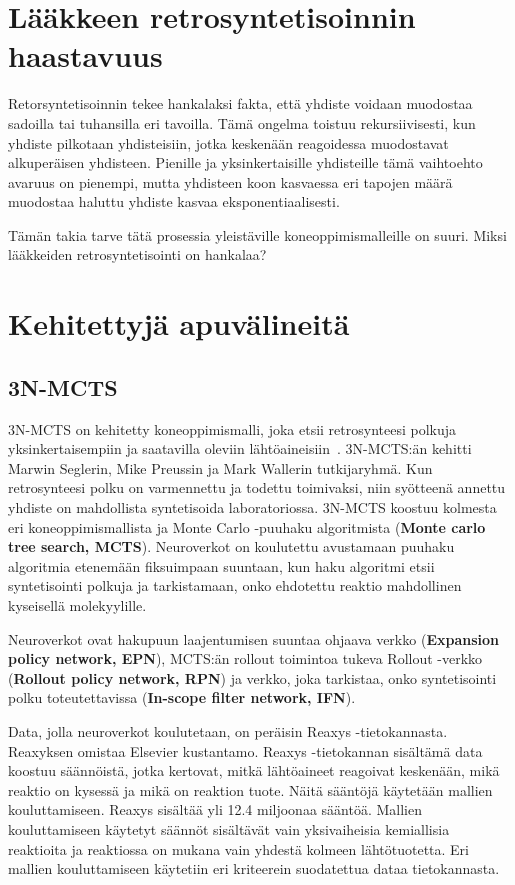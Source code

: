 \documentclass[finnish,twoside,censored,subject,sw-line]{HYthesisML}
\begin{document}
\section{Lääkkeen retrosyntetisoinnin haastavuus}

Retorsyntetisoinnin tekee hankalaksi fakta, että yhdiste voidaan muodostaa sadoilla tai tuhansilla eri tavoilla.
Tämä ongelma toistuu rekursiivisesti, kun yhdiste pilkotaan yhdisteisiin, jotka keskenään reagoidessa muodostavat alkuperäisen yhdisteen.
Pienille ja yksinkertaisille yhdisteille tämä vaihtoehto avaruus on pienempi, mutta yhdisteen koon kasvaessa eri tapojen määrä muodostaa haluttu yhdiste kasvaa eksponentiaalisesti.

Tämän takia tarve tätä prosessia yleistäville koneoppimismalleille on suuri.
Miksi lääkkeiden retrosyntetisointi on hankalaa?~\cite{ButlerKeithT2018Mlfm,deAlmeidaA.Filipa2019Socd}

\section{Kehitettyjä apuvälineitä}

\subsection{3N-MCTS}

3N-MCTS on kehitetty koneoppimismalli, joka etsii retrosynteesi polkuja yksinkertaisempiin
ja saatavilla oleviin lähtöaineisiin~\cite{SeglerMarwinHS2018Pcsw}. 3N-MCTS:än kehitti Marwin Seglerin, Mike Preussin ja Mark Wallerin tutkijaryhmä. Kun retrosynteesi polku on varmennettu ja
todettu toimivaksi, niin syötteenä annettu yhdiste on mahdollista syntetisoida laboratoriossa.
3N-MCTS koostuu kolmesta eri koneoppimismallista ja Monte Carlo -puuhaku algoritmista
(\textbf{Monte carlo tree search, MCTS}). Neuroverkot on koulutettu avustamaan puuhaku algoritmia etenemään
fiksuimpaan suuntaan, kun haku algoritmi etsii syntetisointi polkuja ja tarkistamaan, onko ehdotettu reaktio
mahdollinen kyseisellä molekyylille.

Neuroverkot ovat hakupuun laajentumisen suuntaa ohjaava verkko (\textbf{Expansion policy network, EPN}),
MCTS:än rollout toimintoa tukeva Rollout -verkko (\textbf{Rollout policy network, RPN})
ja verkko, joka tarkistaa, onko syntetisointi polku toteutettavissa (\textbf{In-scope filter network, IFN}).

Data, jolla neuroverkot koulutetaan, on peräisin Reaxys -tietokannasta. Reaxyksen omistaa Elsevier kustantamo. Reaxys -tietokannan sisältämä data koostuu
säännöistä, jotka kertovat, mitkä lähtöaineet reagoivat keskenään, mikä reaktio on kysessä ja mikä on reaktion
tuote. Näitä sääntöjä käytetään mallien kouluttamiseen. Reaxys sisältää yli 12.4 miljoonaa sääntöä. Mallien
kouluttamiseen käytetyt säännöt sisältävät vain yksivaiheisia kemiallisia reaktioita ja reaktiossa on mukana vain
yhdestä kolmeen lähtötuotetta. Eri mallien kouluttamiseen käytetiin eri kriteerein suodatettua dataa tietokannasta.
\end{document}

